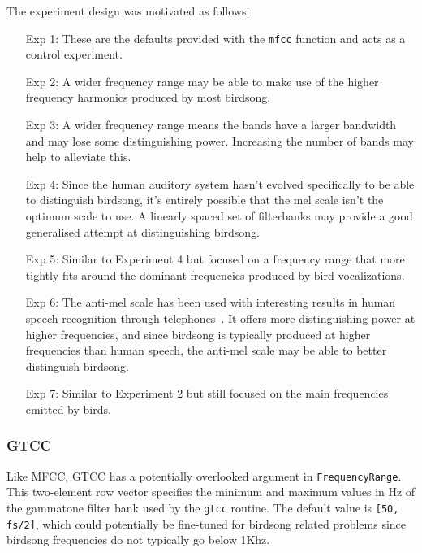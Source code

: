 The experiment design was motivated as follows:

\begin{itemize}

  \item [Exp 1:] These are the defaults provided with the \texttt{mfcc}
    function and acts as a control experiment.

  \item [Exp 2:] A wider frequency range may be able to make use of the
    higher frequency harmonics produced by most birdsong.

  \item [Exp 3:] A wider frequency range means the bands have a larger bandwidth
    and may lose some distinguishing power. Increasing the number of bands may
    help to alleviate this.

  \item [Exp 4:] Since the human auditory system hasn't evolved specifically to be
    able to distinguish birdsong, it's entirely possible that the mel scale
    isn't the optimum scale to use. A linearly spaced set of filterbanks may
    provide a good generalised attempt at distinguishing birdsong.

  \item [Exp 5:] Similar to Experiment 4 but focused on a frequency range that
    more tightly fits around the dominant frequencies produced by bird
    vocalizations.

  \item [Exp 6:] The anti-mel scale has been used with interesting results in
    human speech recognition through telephones~\cite{lei2009mel}. It offers
    more distinguishing power at higher frequencies, and since birdsong is
    typically produced at higher frequencies than human speech, the anti-mel
    scale may be able to better distinguish birdsong.

  \item [Exp 7:] Similar to Experiment 2 but still focused on the main
    frequencies emitted by birds.

\end{itemize}

\subsubsection{GTCC}\label{sssec:gtcc}

Like MFCC, GTCC has a potentially overlooked argument in
\texttt{FrequencyRange}. This two-element row vector specifies the minimum and
maximum values in Hz of the gammatone filter bank used by the \texttt{gtcc}
routine. The default value is \texttt{[50, fs/2]}, which could potentially be
fine-tuned for birdsong related problems since birdsong frequencies do not
typically go below 1Khz.

